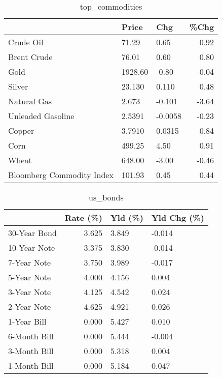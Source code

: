 \documentclass{article}%
\begin{document}
\begin{table}[htbp]%
\caption{top\_commodities}%
\centering%
\begin{adjustbox}{width=1\textwidth}%
\begin{tabular}{lllr}
\toprule
                          &   Price &     Chg &  \%Chg \\
\midrule
               Crude Oil  &   71.29 &    0.65 &  0.92 \\
             Brent Crude  &   76.01 &    0.60 &  0.80 \\
                    Gold  & 1928.60 &   -0.80 & -0.04 \\
                  Silver  &  23.130 &   0.110 &  0.48 \\
             Natural Gas  &   2.673 &  -0.101 & -3.64 \\
       Unleaded Gasoline  &  2.5391 & -0.0058 & -0.23 \\
                  Copper  &  3.7910 &  0.0315 &  0.84 \\
                    Corn  &  499.25 &    4.50 &  0.91 \\
                   Wheat  &  648.00 &   -3.00 & -0.46 \\
Bloomberg Commodity Index &  101.93 &    0.45 &  0.44 \\
\bottomrule
\end{tabular}
%
\end{adjustbox}%
\end{table}

%


\begin{table}[htbp]%
\caption{us\_bonds}%
\centering%
\begin{adjustbox}{width=1\textwidth}%
\begin{tabular}{lrll}
\toprule
             &  Rate (\%) & Yld (\%) & Yld Chg (\%) \\
\midrule
30-Year Bond &     3.625 &   3.849 &      -0.014 \\
10-Year Note &     3.375 &   3.830 &      -0.014 \\
 7-Year Note &     3.750 &   3.989 &      -0.017 \\
 5-Year Note &     4.000 &   4.156 &       0.004 \\
 3-Year Note &     4.125 &   4.542 &       0.024 \\
 2-Year Note &     4.625 &   4.921 &       0.026 \\
 1-Year Bill &     0.000 &   5.427 &       0.010 \\
6-Month Bill &     0.000 &   5.444 &      -0.004 \\
3-Month Bill &     0.000 &   5.318 &       0.004 \\
1-Month Bill &     0.000 &   5.184 &       0.047 \\
\bottomrule
\end{tabular}
%
\end{adjustbox}%
\end{table}
\end{document}
